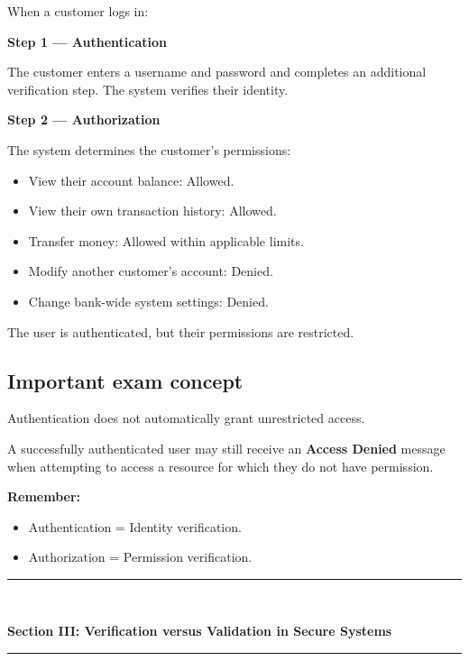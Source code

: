 When a customer logs in:

\textbf{Step 1 --- Authentication}

The customer enters a username and password and completes an additional verification step. The system verifies their identity.

\textbf{Step 2 --- Authorization}

The system determines the customer's permissions:

\begin{itemize}
\item View their account balance: Allowed.
\item View their own transaction history: Allowed.
\item Transfer money: Allowed within applicable limits.
\item Modify another customer's account: Denied.
\item Change bank-wide system settings: Denied.
\end{itemize}

The user is authenticated, but their permissions are restricted.

\subsection{Important exam concept}

Authentication does not automatically grant unrestricted access.

A successfully authenticated user may still receive an \textbf{Access Denied} message when attempting to access a resource for which they do not have permission.

\textbf{Remember:}

\begin{itemize}
\item Authentication = Identity verification.
\item Authorization = Permission verification.
\end{itemize}


\newpage
\begin{center}
\vspace{0.5em}
{\color{primary}\rule{0.45\textwidth}{1.2pt}\\[4pt]}
{\Large\bfseries\color{primary} Section III: Verification versus Validation in Secure Systems\\[2pt]}
{\color{primary}\rule{0.45\textwidth}{1.2pt}}
\vspace{0.5em}
\end{center}

